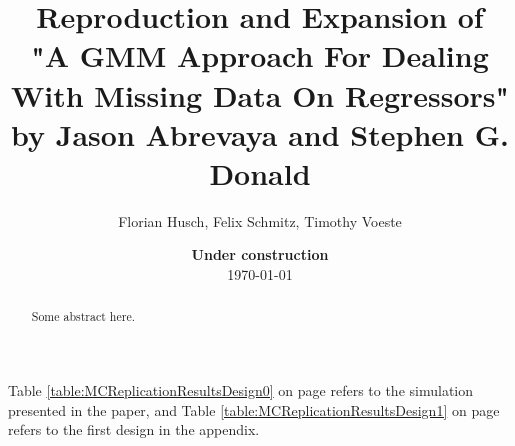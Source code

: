\documentclass[11pt, a4paper, leqno]{article}
\begin{document}
\title{Reproduction and Expansion of \\"A GMM Approach For Dealing With Missing Data On Regressors" by Jason Abrevaya and Stephen G. Donald}

\author{Florian Husch, Felix Schmitz, Timothy Voeste}

\date{
    {\bf Under construction}
    \\[1ex]
    \today
}

\maketitle
{}

\begin{abstract}
    Some abstract here.
\end{abstract}

\clearpage



Table \ref{table:MCReplicationResultsDesign0} on page \pageref{table:MCReplicationResultsDesign0} refers
to the simulation presented in the paper, and Table \ref{table:MCReplicationResultsDesign1} on page \pageref{table:MCReplicationResultsDesign1}
refers to the first design in the appendix.




\end{document}
